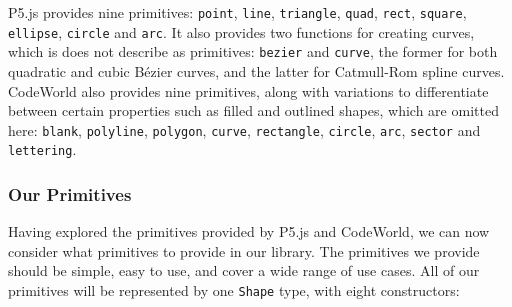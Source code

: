 \documentclass[../main.tex]{subfiles}
\begin{document}
                P5.js provides nine primitives: \texttt{point}, \texttt{line},
                    \texttt{triangle}, \texttt{quad}, \texttt{rect}, \texttt{square},
                    \texttt{ellipse}, \texttt{circle} and \texttt{arc}.
                It also provides two functions for creating curves, which is does not describe
                    as primitives: \texttt{bezier} and \texttt{curve}, the former for both
                    quadratic and cubic Bézier curves, and the latter for Catmull-Rom spline
                    curves.
                CodeWorld also provides nine primitives, along with variations to differentiate
                    between certain properties such as filled and outlined shapes, which are
                    omitted here: \texttt{blank}, \texttt{polyline}, \texttt{polygon},
                    \texttt{curve}, \texttt{rectangle}, \texttt{circle}, \texttt{arc},
                    \texttt{sector} and \texttt{lettering}.

            \subsubsection{Our Primitives}
                Having explored the primitives provided by P5.js and CodeWorld, we can now
                    consider what primitives to provide in our library.
                The primitives we provide should be simple, easy to use, and cover a wide range
                    of use cases.
                All of our primitives will be represented by one \texttt{Shape} type, with eight constructors:
\end{document}
